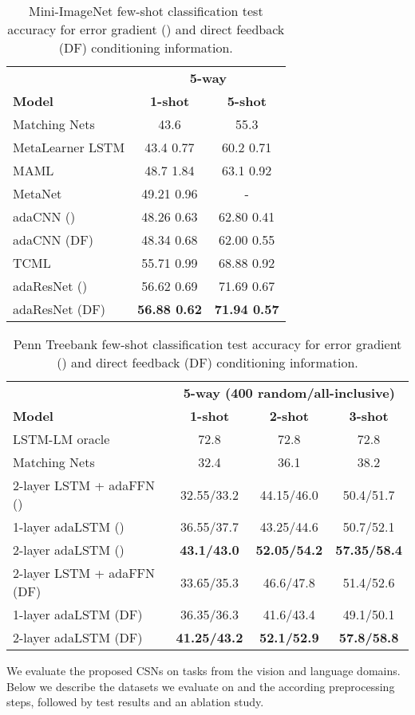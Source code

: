 \documentclass{article}
\begin{document}
\begin{table*}[t] \caption{Mini-ImageNet few-shot classification test accuracy for error gradient () and direct feedback (DF) conditioning information.}
  \label{tab:mini}
  \small
  \centering
  \begin{tabular}{lcc}
    \toprule
    {} & \multicolumn{2}{c}{\bf 5-way} \\
    \cmidrule(l{3pt}r{3pt}){2-3} 
    \bf Model & \bf 1-shot & \bf 5-shot \\
    \midrule
    Matching Nets \cite{vinyals2016matching} & 43.6 & 55.3 \\
    MetaLearner LSTM \cite{Sachin2017} & 43.4  0.77 & 60.2  0.71 \\
    MAML \cite{finn2017model} & 48.7  1.84 & 63.1  0.92 \\
    MetaNet \cite{pmlr-v70-munkhdalai17a} &  49.21  0.96 & - \\
    \midrule
    adaCNN () & 48.26  0.63 & 62.80  0.41 \\
    adaCNN (DF) & 48.34  0.68 & 62.00  0.55 \\
    \midrule \midrule
    TCML \cite{mishra2017meta} & 55.71  0.99 & 68.88  0.92 \\
    \midrule
adaResNet () & 56.62  0.69 & 71.69  0.67 \\
    adaResNet (DF) & \bf 56.88  0.62 & \bf 71.94  0.57 \\
    \bottomrule
  \end{tabular}
\end{table*}
\begin{table*}[t] \caption{Penn Treebank few-shot classification test accuracy for error gradient () and direct feedback (DF) conditioning information.}
  \label{tab:lm}
  \small
  \centering
  \begin{tabular}{lccc}
    \toprule
    {} & \multicolumn{3}{c}{\bf 5-way (400 random/all-inclusive)} \\
    \cmidrule(l{3pt}r{3pt}){2-4} 
    \bf Model & \bf 1-shot & \bf 2-shot & \bf 3-shot \\
    \midrule
    LSTM-LM oracle \cite{vinyals2016matching} & 72.8 & 72.8 & 72.8 \\
    Matching Nets \cite{vinyals2016matching} & 32.4 & 36.1 & 38.2 \\
    \midrule
2-layer LSTM + adaFFN () & 32.55/33.2 &	44.15/46.0 &	50.4/51.7 \\
     1-layer adaLSTM () & 36.55/37.7 &	43.25/44.6 &	50.7/52.1 \\
     2-layer adaLSTM () & \bf 43.1/43.0 & \bf	52.05/54.2 & \bf	57.35/58.4 \\
     2-layer LSTM + adaFFN (DF) & 33.65/35.3 &	46.6/47.8 &	51.4/52.6 \\
    1-layer adaLSTM (DF) & 36.35/36.3 &	41.6/43.4 &	49.1/50.1 \\
    2-layer adaLSTM (DF) & \bf 41.25/43.2 & \bf	52.1/52.9 & \bf	57.8/58.8 \\
    \bottomrule
  \end{tabular}
\end{table*}
We evaluate the proposed CSNs on tasks from the vision and language domains. Below we describe the datasets we evaluate on and the according preprocessing steps, followed by test results and an ablation study.
\end{document}
